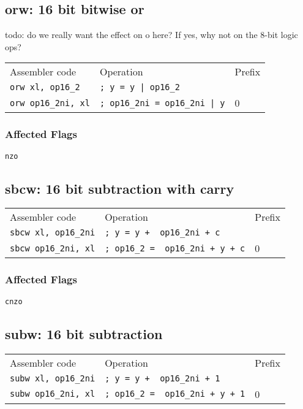 \documentclass{book}
\begin{document}
\subsection{orw: 16 bit bitwise or}

todo: do we really want the effect on o here? If yes, why not on the 8-bit logic ops?

\begin{tabular}{l l l}
Assembler code             & Operation                            & Prefix \\
\texttt{orw xl, op16\_2}   & \texttt{; y = y | op16\_2}           & \\
\texttt{orw op16\_2ni, xl} & \texttt{; op16\_2ni = op16\_2ni | y} & 0
\end{tabular}

\subsubsection*{Affected Flags}

\texttt{nzo}


\subsection{sbcw: 16 bit subtraction with carry}

\begin{tabular}{l l l}
Assembler code              & Operation                               & Prefix \\
\texttt{sbcw xl, op16\_2ni} & \texttt{; y = y + ~op16\_2ni + c}       & \\
\texttt{sbcw op16\_2ni, xl} & \texttt{; op16\_2 = ~op16\_2ni + y + c} & 0
\end{tabular}

\subsubsection*{Affected Flags}

\texttt{cnzo}


\subsection{subw: 16 bit subtraction}

\begin{tabular}{l l l}
Assembler code              & Operation                               & Prefix \\
\texttt{subw xl, op16\_2ni} & \texttt{; y = y + ~op16\_2ni + 1}       & \\
\texttt{subw op16\_2ni, xl} & \texttt{; op16\_2 = ~op16\_2ni + y + 1} & 0
\end{tabular}
\end{document}
